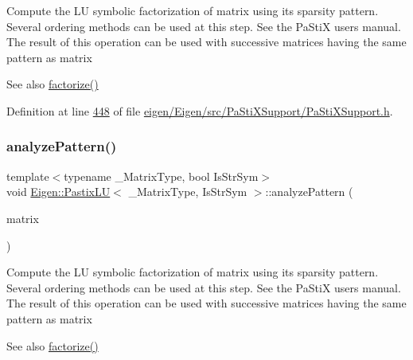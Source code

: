 Compute the LU symbolic factorization of {\ttfamily matrix} using its sparsity pattern. Several ordering methods can be used at this step. See the Pa\+StiX user\textquotesingle{}s manual. The result of this operation can be used with successive matrices having the same pattern as {\ttfamily matrix} \begin{DoxySeeAlso}{See also}
\hyperlink{class_eigen_1_1_pastix_l_u_ac178a87b499a2210a402787fbfd98f26}{factorize()} 
\end{DoxySeeAlso}


Definition at line \hyperlink{eigen_2_eigen_2src_2_pa_sti_x_support_2_pa_sti_x_support_8h_source_l00448}{448} of file \hyperlink{eigen_2_eigen_2src_2_pa_sti_x_support_2_pa_sti_x_support_8h_source}{eigen/\+Eigen/src/\+Pa\+Sti\+X\+Support/\+Pa\+Sti\+X\+Support.\+h}.

\mbox{\label{class_eigen_1_1_pastix_l_u_abae3ca7f1254106d9e2d5e0f273189fa}} 
\subsubsection{\texorpdfstring{analyze\+Pattern()}{analyzePattern()}\hspace{0.1cm}{\footnotesize\ttfamily [2/2]}}
{\footnotesize\ttfamily template$<$typename \+\_\+\+Matrix\+Type, bool Is\+Str\+Sym$>$ \\
void \hyperlink{class_eigen_1_1_pastix_l_u}{Eigen\+::\+Pastix\+LU}$<$ \+\_\+\+Matrix\+Type, Is\+Str\+Sym $>$\+::analyze\+Pattern (\begin{DoxyParamCaption}\item[{const Matrix\+Type \&}]{matrix }\end{DoxyParamCaption})\hspace{0.3cm}{\ttfamily [inline]}}

Compute the LU symbolic factorization of {\ttfamily matrix} using its sparsity pattern. Several ordering methods can be used at this step. See the Pa\+StiX user\textquotesingle{}s manual. The result of this operation can be used with successive matrices having the same pattern as {\ttfamily matrix} \begin{DoxySeeAlso}{See also}
\hyperlink{class_eigen_1_1_pastix_l_u_ac178a87b499a2210a402787fbfd98f26}{factorize()} 
\end{DoxySeeAlso}


